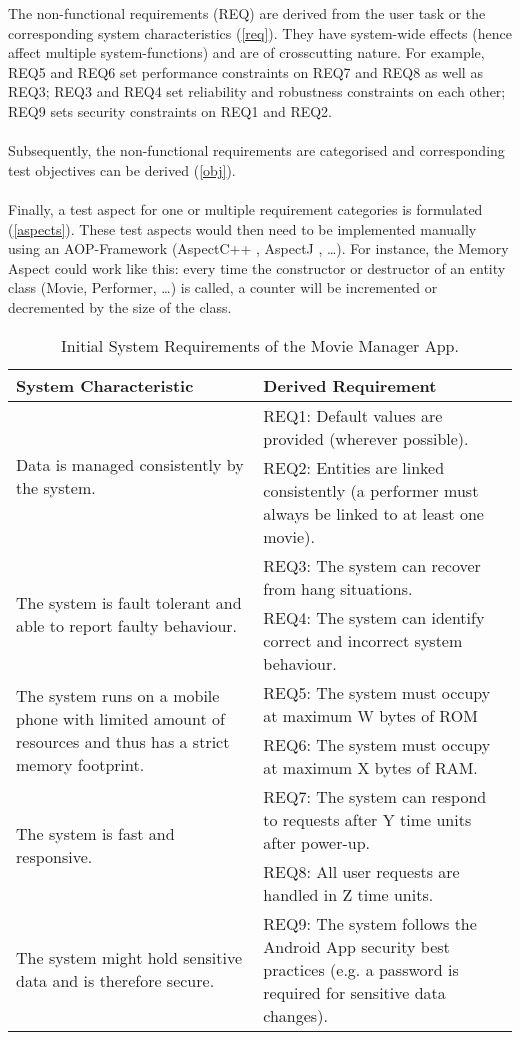  The non-functional requirements (REQ) are derived from the user task or the corresponding system characteristics (\autoref{req}). They have system-wide effects (hence affect multiple system-functions) and are of crosscutting nature. For example, REQ5 and REQ6 set performance constraints on REQ7 and REQ8 as well as REQ3; REQ3 and REQ4 set reliability and robustness constraints on each other; REQ9 sets security constraints on REQ1 and REQ2.\\
\\
 Subsequently, the non-functional requirements are categorised and corresponding test objectives can be derived (\autoref{obj}).\\
\\
Finally, a test aspect for one or multiple requirement categories is formulated (\autoref{aspects}). These test aspects would then need to be implemented manually using an AOP-Framework (AspectC++ \cite{C++}, AspectJ \cite{J}, …). For instance, the Memory Aspect could work like this: every time the constructor or destructor of an entity class (Movie, Performer, …) is called, a counter will be incremented or decremented by the size of the class.

\begin{table}[h]
\begin{small}
\caption{Initial System Requirements of the Movie Manager App.}
\begin{tabular}{p{7cm}|p{7cm}}
\hline
\textbf{System Characteristic} & \textbf{Derived Requirement}\\
\hline
\multirow{2}{6.5cm}{Data is managed consistently by the system.} & REQ1: Default values are provided (wherever possible).\\
 & REQ2: Entities are linked consistently (a performer must always be linked to at least one movie).\\ 
\hline  
\multirow{2}{6.5cm}{The system is fault tolerant and able to report faulty behaviour.} & REQ3: The system can recover from hang situations.\\
 & REQ4: The system can identify correct and incorrect system behaviour.\\
\hline 
\multirow{2}{6.5cm}{The system runs on a mobile phone with limited amount of resources and thus has a strict memory footprint.} & REQ5: The system must occupy at maximum W bytes of ROM\\
 & REQ6: The system must occupy at maximum X bytes of RAM.\\
\hline 
\multirow{2}{6.5cm}{The system is fast and responsive.} & REQ7: The system can respond to requests after Y time units after power-up.\\
 & REQ8: All user requests are handled in Z time units.\\
\hline  
The system might hold sensitive data and is therefore secure. & REQ9: The system follows the Android App security best practices (e.g. a password is required for sensitive data changes).\\
\hline
\end{tabular}
\label{req}
\end{small}
\end{table}

